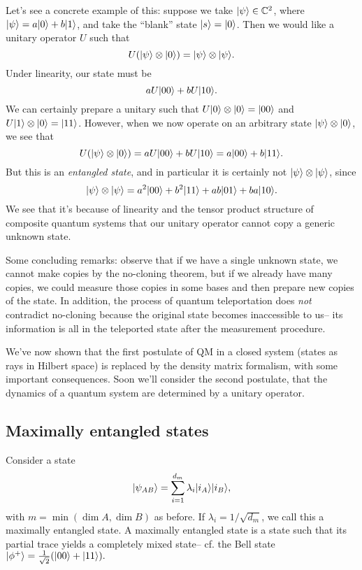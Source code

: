 \begin{exm}
    Let's see a concrete example of this: suppose we take $\lvert\psi\rangle\in \mathbb{C}^2$, where $\lvert\psi\rangle= a\lvert0\rangle + b\lvert1\rangle$, and take the ``blank'' state $\lvert s\rangle=\lvert0\rangle$. Then we would like a unitary operator $U$ such that
    \begin{equation}
        U(\lvert\psi\rangle\otimes \lvert0\rangle)=\lvert\psi\rangle\otimes \lvert\psi\rangle.
    \end{equation}
    Under linearity, our state must be
    \begin{equation}
        a U\lvert00\rangle+b U\lvert10\rangle.
    \end{equation}
    We can certainly prepare a unitary such that $U\lvert0\rangle\otimes \lvert0\rangle=\lvert00\rangle$ and $U\lvert1\rangle\otimes \lvert0\rangle=\lvert11\rangle$. However, when we now operate on an arbitrary state $\lvert\psi\rangle\otimes \lvert0\rangle$, we see that
    \begin{equation}
        U(\lvert\psi\rangle\otimes \lvert0\rangle)=aU \lvert00\rangle+b U\lvert10\rangle = a\lvert00\rangle +b\lvert11\rangle.
    \end{equation}
    But this is an \emph{entangled state}, and in particular it is certainly not $\lvert\psi\rangle\otimes \lvert\psi\rangle$, since
    \begin{equation}
        \lvert\psi\rangle\otimes \lvert\psi\rangle =a^2 \lvert00\rangle + b^2 \lvert11\rangle + ab\lvert01\rangle +ba \lvert10\rangle.
    \end{equation}
    We see that it's because of linearity and the tensor product structure of composite quantum systems that our unitary operator cannot copy a generic unknown state.
\end{exm}

Some concluding remarks: observe that if we have a single unknown state, we cannot make copies by the no-cloning theorem, but if we already have many copies, we could measure those copies in some bases and then prepare new copies of the state. In addition, the process of quantum teleportation does \emph{not} contradict no-cloning because the original state becomes inaccessible to us-- its information is all in the teleported state after the measurement procedure.

We've now shown that the first postulate of QM in a closed system (states as rays in Hilbert space) is replaced by the density matrix formalism, with some important consequences. Soon we'll consider the second postulate, that the dynamics of a quantum system are determined by a unitary operator.

\subsection*{Maximally entangled states} Consider a state
\begin{equation}
    \lvert\psi_{AB}\rangle=\sum_{i=1}^{d_m} \lambda_i \lvert i_A\rangle \lvert i_B\rangle,
\end{equation}
with $m=\min(\dim A,\dim B)$ as before. If $\lambda_i=1/\sqrt{d_m}$, we call this a maximally entangled state. A maximally entangled state is a state such that its partial trace yields a completely mixed state-- cf. the Bell state $\lvert\phi^+\rangle=\frac{1}{\sqrt{2}}(\lvert00\rangle+\lvert11\rangle).$